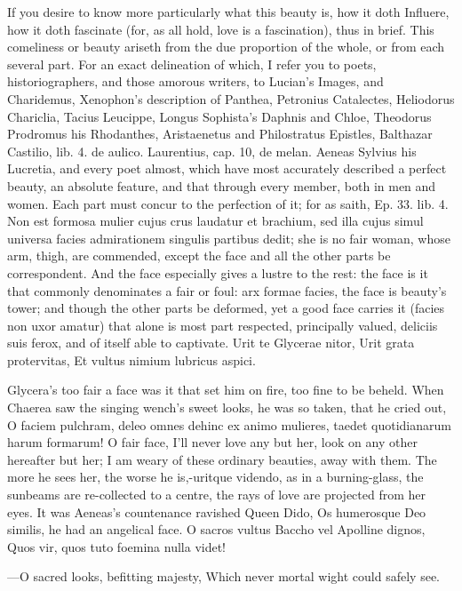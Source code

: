 If you desire to know more particularly what this beauty is, how it
doth Influere, how it doth fascinate (for, as all hold, love is a
fascination), thus in brief. This comeliness or beauty ariseth
from the due proportion of the whole, or from each several part. For an
exact delineation of which, I refer you to poets, historiographers, and
those amorous writers, to Lucian's Images, and Charidemus, Xenophon's
description of Panthea, Petronius Catalectes, Heliodorus Chariclia,
Tacius Leucippe, Longus Sophista's Daphnis and Chloe, Theodorus
Prodromus his Rhodanthes, Aristaenetus and Philostratus Epistles,
Balthazar Castilio, lib. 4. de aulico. Laurentius, cap. 10, de melan.
Aeneas Sylvius his Lucretia, and every poet almost, which have most
accurately described a perfect beauty, an absolute feature, and that
through every member, both in men and women. Each part must concur to
the perfection of it; for as \Seneca{} saith, Ep. 33. lib. 4. Non est
formosa mulier cujus crus laudatur et brachium, sed illa cujus simul
universa facies admirationem singulis partibus dedit; she is no fair
woman, whose arm, thigh, \etc{} are commended, except the face and all the
other parts be correspondent. And the face especially gives a lustre to
the rest: the face is it that commonly denominates a fair or foul: arx
formae facies, the face is beauty's tower; and though the other parts
be deformed, yet a good face carries it (facies non uxor amatur) that
alone is most part respected, principally valued, deliciis suis ferox,
and of itself able to captivate.
Urit te Glycerae nitor,
Urit grata protervitas,
Et vultus nimium lubricus aspici.

Glycera's too fair a face was it that set him on fire, too fine to be
beheld. When Chaerea saw the singing wench's sweet looks, he was
so taken, that he cried out, O faciem pulchram, deleo omnes dehinc ex
animo mulieres, taedet quotidianarum harum formarum! O fair face, I'll
never love any but her, look on any other hereafter but her; I am weary
of these ordinary beauties, away with them. The more he sees her, the
worse he is,-uritque videndo, as in a burning-glass, the sunbeams are
re-collected to a centre, the rays of love are projected from her eyes.
It was Aeneas's countenance ravished Queen Dido, Os humerosque Deo
similis, he had an angelical face.
O sacros vultus Baccho vel Apolline dignos,
Quos vir, quos tuto foemina nulla videt!

---O sacred looks, befitting majesty,
Which never mortal wight could safely see.

